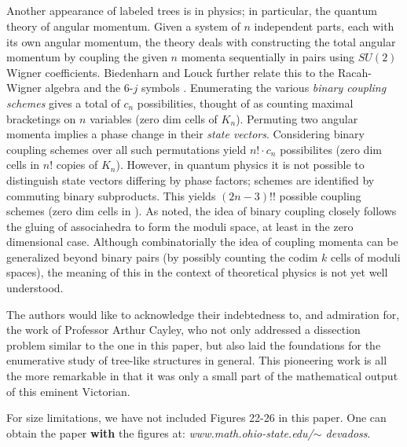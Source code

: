 \documentclass[10pt]{amsart}
\begin{document}
            \subsection{}
            Another appearance of labeled trees is in physics; in particular, the quantum theory of angular momentum. Given a system of $n$ independent parts, each with its own angular momentum, the theory deals with constructing the total angular momentum by coupling the given $n$ momenta sequentially in pairs using $SU(2)$ Wigner coefficients. Biedenharn and Louck further relate this to the Racah-Wigner algebra and the 6-$j$ symbols \cite[\S5]{racah}. Enumerating the various {\em binary coupling schemes} gives a total of $c_n$ possibilities, thought of as counting maximal bracketings on $n$ variables (zero dim cells of $K_n$). Permuting two angular momenta implies a phase change in their {\em state vectors}.  Considering  binary coupling schemes over all such permutations  yield $n! \cdot c_n$ possibilites (zero dim cells in $n!$ copies of $K_n$).  However, in quantum physics it is not possible to distinguish state vectors differing by phase factors; schemes are identified by commuting binary subproducts. This yields $(2n-3)!!$ possible coupling schemes (zero dim cells in ).  As noted, the idea of binary coupling closely follows the gluing of associahedra to form the moduli space, at least in the zero dimensional case.  Although combinatorially the idea of coupling momenta can be generalized beyond binary pairs (by possibly counting the codim $k$ cells of moduli spaces), the meaning of this in the context of theoretical physics is not yet well understood.
            
                        
            \vspace{.5in}
            
            {\small
            \begin{ack}
            The authors would like to acknowledge their indebtedness to, and admiration for, the work of Professor Arthur Cayley, who not only addressed a dissection problem similar to the one in this paper, but also laid the foundations for the enumerative study of tree-like structures in general.   This pioneering work is all the more remarkable in that it was only a small part of the mathematical output of this eminent Victorian.
            \end{ack}}
            
                                                                        
            \begin{rem}
            For size limitations, we have not included Figures 22-26 in this paper.  One can obtain the paper {\bf with} the figures at:  {\em www.math.ohio-state.edu/$\sim$ devadoss}.
            \end{rem}
            
\end{document}
